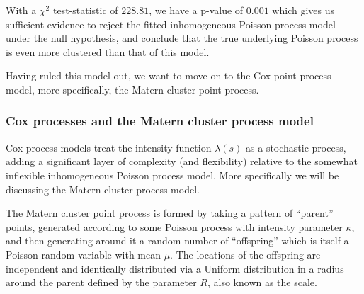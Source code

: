 \documentclass[
  12pt,
]{article}
\begin{document}
\begin{table}[!h]

\caption{\label{tab:fit2-quadrat-test}Results of the quadrat test for the fitted inhomogenous Poisson process model}
\centering
{}
\end{table}

With a \(\chi^2\) test-statistic of \(228.81\), we have a p-value of
\(0.001\) which gives us sufficient evidence to reject the fitted
inhomogeneous Poisson process model under the null hypothesis, and
conclude that the true underlying Poisson process is even more clustered
than that of this model.

Having ruled this model out, we want to move on to the Cox point process
model, more specifically, the Matern cluster point process.

\hypertarget{cox-processes-and-the-matern-cluster-process-model}{%
\subsubsection{Cox processes and the Matern cluster process
model}\label{cox-processes-and-the-matern-cluster-process-model}}

Cox process models treat the intensity function \(\lambda(s)\) as a
stochastic process, adding a significant layer of complexity (and
flexibility) relative to the somewhat inflexible inhomogeneous Poisson
process model. More specifically we will be discussing the Matern
cluster process model.

The Matern cluster point process is formed by taking a pattern of
``parent'' points, generated according to some Poisson process with
intensity parameter \(\kappa\), and then generating around it a random
number of ``offspring'' which is itself a Poisson random variable with
mean \(\mu\). The locations of the offspring are independent and
identically distributed via a Uniform distribution in a radius around
the parent defined by the parameter \(R\), also known as the scale.
\end{document}
